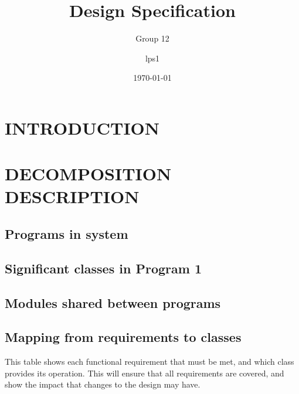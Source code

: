 \documentclass{project}
\begin{document}
\title{Design Specification}
\subtitle{Group 12}
\author{lps1}     
\date{\today}
\maketitle
\tableofcontents

\section{INTRODUCTION}

\section{DECOMPOSITION DESCRIPTION}
\subsection{Programs in system}
\subsection{Significant classes in Program 1}
\subsection{Modules shared between programs}
\subsection{Mapping from requirements to classes}

This table shows each functional requirement that must be met, and which class provides its operation. This will ensure that all requirements are covered, and show the impact that changes to the design may have.
\end{document}
